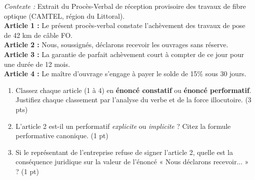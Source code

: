 \documentclass[11pt]{article}
\begin{document}
\begin{exercice}
\textit{Contexte :} Extrait du Procès-Verbal de réception provisoire des travaux de fibre optique (CAMTEL, région du Littoral). \\
\og \textbf{Article 1 :} Le présent procès-verbal constate l'achèvement des travaux de pose de 42 km de câble FO. \\
\textbf{Article 2 :} Nous, soussignés, déclarons recevoir les ouvrages sans réserve. \\
\textbf{Article 3 :} La garantie de parfait achèvement court à compter de ce jour pour une durée de 12 mois. \\
\textbf{Article 4 :} Le maître d'ouvrage s'engage à payer le solde de 15\% sous 30 jours. \fg{}

\begin{enumerate}
    \item Classez chaque article (1 à 4) en \textbf{énoncé constatif} ou \textbf{énoncé performatif}. Justifiez chaque classement par l'analyse du verbe et de la force illocutoire. (3 pts)
    \item L'article 2 est-il un performatif \textit{explicite} ou \textit{implicite} ? Citez la formule performative canonique. (1 pt)
    \item Si le représentant de l'entreprise refuse de signer l'article 2, quelle est la conséquence juridique sur la valeur de l'énoncé « Nous déclarons recevoir... » ? (1 pt)
\end{enumerate}
\end{exercice}
\end{document}
